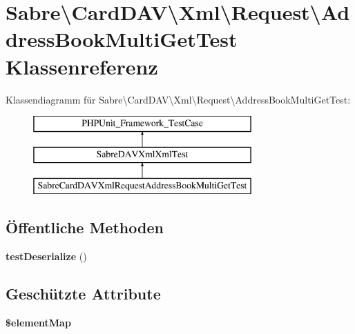 \hypertarget{class_sabre_1_1_card_d_a_v_1_1_xml_1_1_request_1_1_address_book_multi_get_test}{}\section{Sabre\textbackslash{}Card\+D\+AV\textbackslash{}Xml\textbackslash{}Request\textbackslash{}Address\+Book\+Multi\+Get\+Test Klassenreferenz}
\label{class_sabre_1_1_card_d_a_v_1_1_xml_1_1_request_1_1_address_book_multi_get_test}
Klassendiagramm für Sabre\textbackslash{}Card\+D\+AV\textbackslash{}Xml\textbackslash{}Request\textbackslash{}Address\+Book\+Multi\+Get\+Test\+:\begin{figure}[H]
\begin{center}
\leavevmode
\includegraphics[height=3.000000cm]{class_sabre_1_1_card_d_a_v_1_1_xml_1_1_request_1_1_address_book_multi_get_test}
\end{center}
\end{figure}
\subsection*{Öffentliche Methoden}
\begin{DoxyCompactItemize}
\item 
\mbox{\label{class_sabre_1_1_card_d_a_v_1_1_xml_1_1_request_1_1_address_book_multi_get_test_a7e3bb9c77a2105485a7dbeaefc7e43c4}} 
{\bfseries test\+Deserialize} ()
\end{DoxyCompactItemize}
\subsection*{Geschützte Attribute}
\begin{DoxyCompactItemize}
\item 
{\bfseries \$element\+Map}
\end{DoxyCompactItemize}


